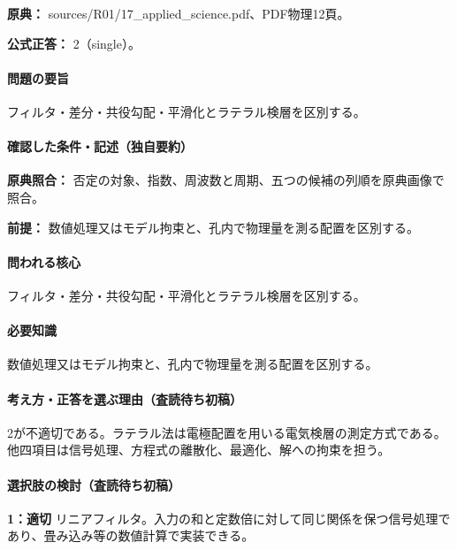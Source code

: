 \noindent\textbf{原典：} sources/R01/17\_applied\_science.pdf、PDF物理12頁。

\textbf{公式正答：} 2（single）。

\paragraph{問題の要旨} フィルタ・差分・共役勾配・平滑化とラテラル検層を区別する。

\paragraph{確認した条件・記述（独自要約）}\mbox{}\par

\noindent\textbf{原典照合：} 否定の対象、指数、周波数と周期、五つの候補の列順を原典画像で照合。\par

\noindent\textbf{前提：} 数値処理又はモデル拘束と、孔内で物理量を測る配置を区別する。\par

\paragraph{問われる核心} フィルタ・差分・共役勾配・平滑化とラテラル検層を区別する。

\paragraph{必要知識} 数値処理又はモデル拘束と、孔内で物理量を測る配置を区別する。

\paragraph{考え方・正答を選ぶ理由（査読待ち初稿）} 2が不適切である。ラテラル法は電極配置を用いる電気検層の測定方式である。他四項目は信号処理、方程式の離散化、最適化、解への拘束を担う。

\paragraph{選択肢の検討（査読待ち初稿）}\mbox{}\par

\noindent\textbf{1：適切} リニアフィルタ。入力の和と定数倍に対して同じ関係を保つ信号処理であり、畳み込み等の数値計算で実装できる。\par

